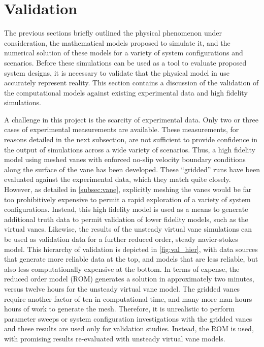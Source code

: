 
\section{Validation}
\label{sec:validation}

%
%
%

%
%

The previous sections briefly outlined the physical phenomenon under
consideration, the mathematical models proposed to simulate it,
and the numerical solution of these models for a variety of system 
configurations and scenarios. Before these simulations can be used 
as a tool to evaluate proposed system designs, it is necessary to
validate that the physical model in use accurately represent
reality. This section contains a discussion of the validation of the
computational models against existing experimental data and high
fidelity simulations. 

A challenge in this project is the scarcity of experimental data. Only
two or three cases of experimental measurements are available. These
measurements, for reasons detailed in the next subsection, are not
sufficient to provide confidence in the output of simulations across a
wide variety  of scenarios. Thus, a high fidelity model using 
meshed vanes with enforced no-slip velocity boundary conditions along
the surface of the vane has been developed. These ``gridded'' runs have
been evaluated against the experimental data, which they match quite
closely. However, as detailed in 
\ref{subsec:vane}, explicitly meshing the vanes would be far too
prohibitively expensive to permit a rapid exploration of a variety of
system configurations. Instead, this high fidelity model is used as a
means to generate additional truth data to permit validation of lower
fidelity models, such as the virtual vanes. Likewise, the results of the
unsteady virtual vane simulations can be used as validation data for a
further reduced order, steady navier-stokes model. This hierarchy of
validation is depicted in \ref{fig:val_hier}, with data sources that
generate more reliable data at the top, and models that are less
reliable, but also less computationally expensive at the bottom. In
terms of expense, the reduced order model (ROM) generates a solution in
approximately two minutes, versus twelve hours for the unsteady virtual
vane model. The gridded vanes require another factor of ten in
computational time, and many more man-hours hours of work to generate
the mesh. Therefore, it is unrealistic to perform parameter sweeps or
system configuration investigations with the gridded vanes and these
results are used only for validation studies. Instead, the
ROM is used, with promising results re-evaluated with unsteady virtual
vane models. %

